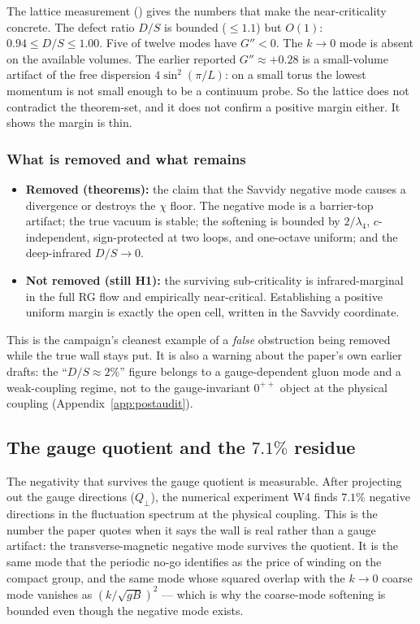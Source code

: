 The lattice measurement () gives the numbers that make the
near-criticality concrete. The defect ratio $D/S$ is bounded ($\le1.1$) but $O(1)$:
$0.94\le D/S\le1.00$. Five of twelve modes have $G''<0$. The $k\to0$ mode is absent on the
available volumes. The earlier reported $G''\approx+0.28$ is a small-volume artifact of the
free dispersion $4\sin^2(\pi/L)$: on a small torus the lowest momentum is not small enough to
be a continuum probe. So the lattice does not contradict the theorem-set, and it does not
confirm a positive margin either. It shows the margin is thin.

\figsavcell

\subsubsection{What is removed and what remains}

\begin{itemize}
\item \textbf{Removed (theorems):} the claim that the Savvidy negative mode causes a divergence
  or destroys the $\chi$ floor. The negative mode is a barrier-top artifact; the true vacuum is
  stable; the softening is bounded by $2/\lambda_4$, $c$-independent, sign-protected at two
  loops, and one-octave uniform; and the deep-infrared $D/S\to0$.
\item \textbf{Not removed (still H1):} the surviving sub-criticality is infrared-marginal in the
  full RG flow and empirically near-critical. Establishing a positive uniform margin is exactly
  the open cell, written in the Savvidy coordinate.
\end{itemize}

This is the campaign's cleanest example of a \emph{false} obstruction being removed while the
true wall stays put. It is also a warning about the paper's own earlier drafts: the
``$D/S\approx2\%$'' figure belongs to a gauge-dependent gluon mode and a weak-coupling regime, not
to the gauge-invariant $0^{++}$ object at the physical coupling (Appendix~\ref{app:postaudit}).

\subsection{The gauge quotient and the $7.1\%$ residue}

The negativity that survives the gauge quotient is measurable. After projecting out the gauge
directions ($Q_\perp$), the numerical experiment W4 finds $7.1\%$ negative directions in the
fluctuation spectrum at the physical coupling. This is the number the paper quotes when it says
the wall is real rather than a gauge artifact: the transverse-magnetic negative mode survives
the quotient. It is the same mode that the periodic no-go identifies as the price of winding on
the compact group, and the same mode whose squared overlap with the $k\to0$ coarse mode vanishes
as $(k/\sqrt{gB})^2$ --- which is why the coarse-mode softening is bounded even though the
negative mode exists.

